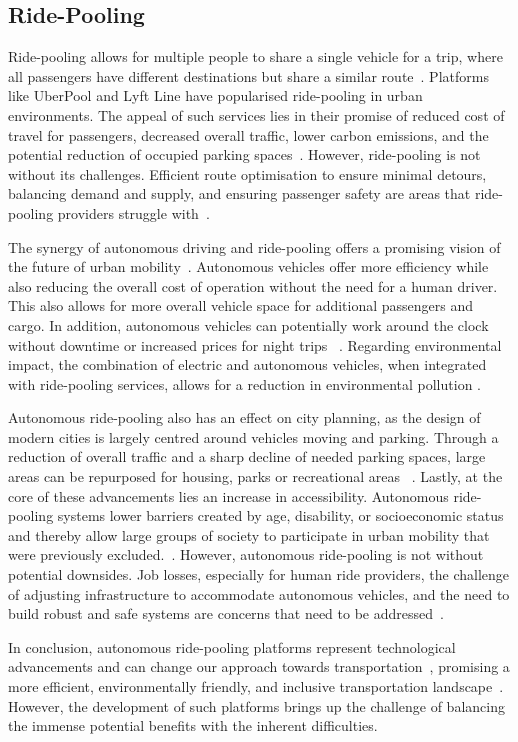 \subsection{Ride-Pooling}
Ride-pooling allows for multiple people to share a single vehicle for a trip, where all passengers have different destinations but share a similar route~\cite{Perivier.}. 
Platforms like UberPool and Lyft Line have popularised ride-pooling in urban environments. The appeal of such services lies in their promise of reduced cost of travel for passengers, decreased overall traffic, lower carbon emissions, and the potential reduction of occupied parking spaces~\cite{Shaheen.}. However, ride-pooling is not without its challenges. Efficient route optimisation to ensure minimal detours, balancing demand and supply, and ensuring passenger safety are areas that ride-pooling providers struggle with~\cite{Perivier.}. 

The synergy of autonomous driving and ride-pooling offers a promising vision of the future of urban mobility~\cite{Stamadianos.2023}. Autonomous vehicles offer more efficiency while also reducing the overall cost of operation without the need for a human driver. This also allows for more overall vehicle space for additional passengers and cargo. In addition, autonomous vehicles can potentially work around the clock without downtime or increased prices for night trips ~\cite{Hacohen.2022,Stamadianos.2023}. Regarding environmental impact, the combination of electric and autonomous vehicles, when integrated with ride-pooling services, allows  for a reduction in environmental pollution \cite{Hacohen.2022,Stamadianos.2023}. 
 
Autonomous ride-pooling also has an effect on city planning, as the design of modern cities is largely centred around vehicles moving and parking. Through a reduction of overall traffic and a sharp decline of needed parking spaces, large areas can be repurposed for housing, parks or recreational areas ~\cite{Stamadianos.2023}. Lastly, at the core of these advancements lies an increase in accessibility.  Autonomous ride-pooling systems lower barriers created by age, disability, or socioeconomic status and thereby allow large groups of society to participate in urban mobility that were previously excluded.~\cite{Hacohen.2022}.
However, autonomous ride-pooling is not without potential downsides. Job losses, especially for  human ride providers, the challenge of adjusting infrastructure to accommodate autonomous vehicles, and the need to build robust and safe systems are concerns that need to be addressed~\cite{Hacohen.2022}.

In conclusion, autonomous ride-pooling platforms represent technological advancements and can change our approach towards transportation~\cite{Shaheen.}, promising a more efficient, environmentally friendly, and inclusive transportation landscape~\cite{Stamadianos.2023}. However, the development of such platforms brings up the challenge of balancing the immense potential benefits with the inherent difficulties. 